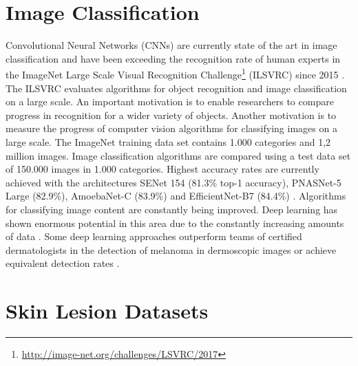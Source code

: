 \documentclass[journal]{IEEEtran}
\begin{document}
\section{Image Classification}
Convolutional Neural Networks (CNNs) \cite{krizhevsky2012imagenet} are currently state of the art in image classification and have been exceeding the recognition rate of human experts in the ImageNet Large Scale Visual Recognition Challenge\footnote{\url{http://image-net.org/challenges/LSVRC/2017}} (ILSVRC) \cite{russakovsky2015imagenet} since 2015 \cite{Langlotz}.
The ILSVRC evaluates algorithms for object recognition and image classification on a large scale. An important motivation is to enable researchers to compare progress in recognition for a wider variety of objects. Another motivation is to measure the progress of computer vision algorithms for classifying images on a large scale. The ImageNet training data set contains 1.000 categories and 1,2 million images. Image classification algorithms are compared using a test data set of 150.000 images in 1.000 categories. Highest accuracy rates are currently achieved with the architectures SENet \cite{hu2018squeeze} 154 (81.3\% top-1 accuracy), PNASNet-5 Large \cite{DBLP:journals/corr/abs-1712-00559} (82.9\%), AmoebaNet-C \cite{Liu_2018_ECCV, real2019regularized} (83.9\%) and EfficientNet-B7 \cite{ DBLP:journals/corr/abs-1905-11946} (84.4\%) \cite{bianco2018benchmark}.
Algorithms for classifying image content are constantly being improved. Deep learning has shown enormous potential in this area due to the constantly increasing amounts of data \cite{cui2019assessing,  fujisawa2019possibility}. Some deep learning approaches outperform teams of certified dermatologists in the detection of melanoma in dermoscopic images \cite{hekler2019superior,  maron2019systematic, brinker2019deep} or achieve equivalent detection rates \cite{ blum2004digital, zortea2014performance}.










\section{Skin Lesion Datasets} \label{section_datasets}
\end{document}
